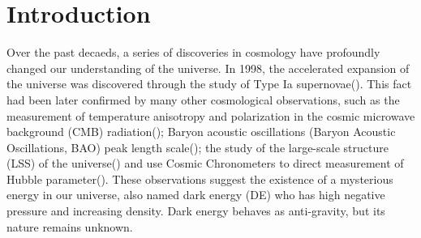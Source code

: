 \documentclass[manuscript]{aastex631}
\begin{document}

\section{Introduction} \label{sec:intro}
Over the past decaeds, a series of discoveries in cosmology have profoundly changed our understanding of the universe. In 1998, the accelerated expansion of the universe was discovered through the study of Type Ia supernovae(\cite{perlmutter_discovery_1998,Riess_1998}). This fact had been later confirmed by many other cosmological observations, such as the measurement of temperature anisotropy and polarization in the cosmic microwave background (CMB) radiation(\cite{1992ApJ...396L...1S,2020Planck}); Baryon acoustic oscillations (Baryon Acoustic Oscillations, BAO) peak length scale(\cite{Eisenstein_2005,10.1111/j.1365-2966.2011.19592.x}); the study of the large-scale structure (LSS) of the universe(\cite{Dodelson_2002,Percival_2007}) and use Cosmic Chronometers to direct measurement of Hubble parameter(\cite{Daniel_Stern_2010,Moresco_2015}). These observations suggest the existence of a mysterious energy in our universe, also named dark energy (DE)  who has high negative pressure and increasing density. Dark energy behaves as anti-gravity, but its nature remains unknown.
\end{document}
